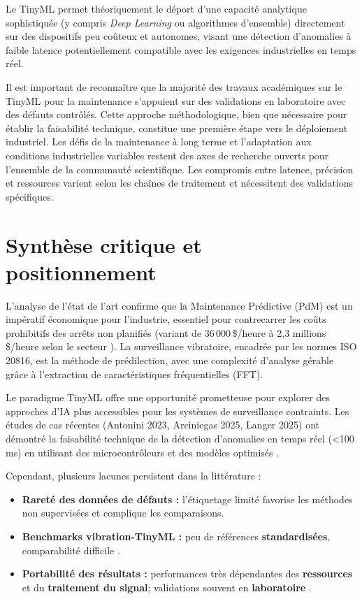 \begin{itemize}
Le TinyML permet théoriquement le déport d'une capacité analytique sophistiquée (y compris \textit{Deep Learning} ou algorithmes d'ensemble) directement sur des dispositifs peu coûteux et autonomes, visant une détection d'anomalies à faible latence potentiellement compatible avec les exigences industrielles en temps réel.

Il est important de reconnaître que la majorité des travaux académiques sur le TinyML pour la maintenance s'appuient sur des validations en laboratoire avec des défauts contrôlés. Cette approche méthodologique, bien que nécessaire pour établir la faisabilité technique, constitue une première étape vers le déploiement industriel. Les défis de la maintenance à long terme et l'adaptation aux conditions industrielles variables restent des axes de recherche ouverts pour l'ensemble de la communauté scientifique. Les compromis entre latence, précision et ressources varient selon les chaînes de traitement et nécessitent des validations spécifiques.

\section{Synthèse critique et positionnement}
\label{sec:synthese_critique}

L'analyse de l'état de l'art confirme que la Maintenance Prédictive (PdM) est un impératif économique pour l'industrie, essentiel pour contrecarrer les coûts prohibitifs des arrêts non planifiés (variant de 36\,000\,\$/heure à 2,3 millions\,\$/heure selon le secteur \cite{siemens2024}). La surveillance vibratoire, encadrée par les normes ISO 20816, est la méthode de prédilection, avec une complexité d'analyse gérable grâce à l'extraction de caractéristiques fréquentielles (FFT).

Le paradigme TinyML offre une opportunité prometteuse pour explorer des approches d'IA plus accessibles pour les systèmes de surveillance contraints. Les études de cas récentes (Antonini 2023, Arciniegas 2025, Langer 2025) ont démontré la faisabilité technique de la détection d'anomalies en temps réel (<100\,ms) en utilisant des microcontrôleurs et des modèles optimisés \cite{antonini2023,arciniegas2025,langer2025}.

Cependant, plusieurs lacunes persistent dans la littérature :

\begin{itemize}
\item \textbf{Rareté des données de défauts :} l'étiquetage limité favorise les méthodes non supervisées et complique les comparaisons.
\item \textbf{Benchmarks vibration-TinyML :} peu de références \textbf{standardisées}, comparabilité difficile \cite{banbury2021}.
\item \textbf{Portabilité des résultats :} performances très dépendantes des \textbf{ressources} et du \textbf{traitement du signal}; validations souvent en \textbf{laboratoire} \cite{antonini2023,arciniegas2025,langer2025}.
\end{itemize}


\end{itemize}
